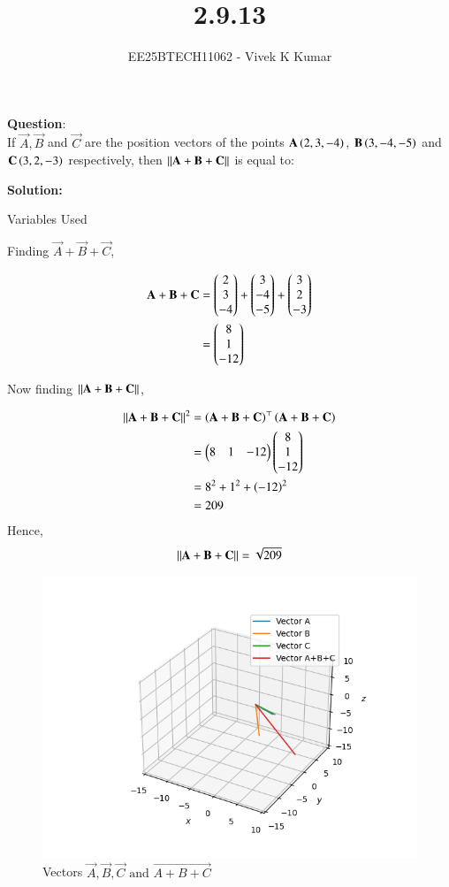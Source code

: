 \documentclass[journal]{IEEEtran}
\title{2.9.13}
\author{EE25BTECH11062 - Vivek K Kumar}
\begin{document}
\maketitle

\renewcommand{\thefigure}{\theenumi}
\renewcommand{\thetable}{\theenumi}


\textbf{Question}:\\
If $\vec{A}, \vec{B}$ and $\vec{C}$ are the position vectors of the points $\mathbf{A}\left(2, 3, -4\right)$, $\mathbf{B}\left(3, -4, -5\right)$ and $\mathbf{C}\left(3, 2, -3\right)$ respectively, then $\left\lVert\mathbf{A}+\mathbf{B}+\mathbf{C}\right\rVert$ is equal to:

\textbf{Solution: }
\begin{table}[H]    
  \centering
  
  \caption{Variables Used}
  \label{tab:2.5.30}
\end{table}
Finding $\vec{A} + \vec{B} + \vec{C}$,

\begin{align}
\mathbf{A} + \mathbf{B} + \mathbf{C} &= \begin{pmatrix}2\\3\\-4\end{pmatrix} + \begin{pmatrix}3\\-4\\-5\end{pmatrix} + \begin{pmatrix}3\\2\\-3\end{pmatrix}\\
&= \begin{pmatrix}8\\1\\-12\end{pmatrix}
\end{align}

Now finding $\left\lVert\mathbf{A} + \mathbf{B} + \mathbf{C}\right\rVert$,

\begin{align}
\left\lVert\mathbf{A} + \mathbf{B} + \mathbf{C}\right\rVert^2 &= \left(\mathbf{A+B+C}\right)^\top\left(\mathbf{A+B+C}\right) \\
&= \begin{pmatrix}8 & 1 & -12\end{pmatrix}\begin{pmatrix}8 \\ 1 \\ -12\end{pmatrix}\\
&= 8^2 + 1^2 + \left(-12\right)^2\\
&= 209
\end{align}
Hence, 
\begin{align}
\left\lVert\mathbf{A+B+C}\right\rVert = \sqrt{209}
\end{align}
\begin{figure}[H]
   \centering
  \includegraphics[width=0.64\columnwidth]{figs/fig.png}
   \caption{Vectors $\vec{A}, \vec{B}, \vec{C} \text{ and } \vec{A+B+C}$}
   \label{stemplot}
\end{figure}
\end{document}
